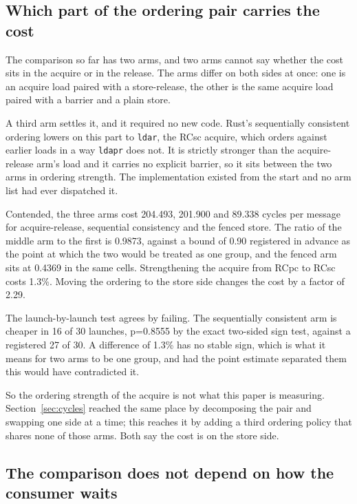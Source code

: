 \documentclass[conference]{IEEEtran}
\begin{document}
\subsection{Which part of the ordering pair carries the cost}

The comparison so far has two arms, and two arms cannot say whether the cost
sits in the acquire or in the release. The arms differ on both sides at once:
one is an acquire load paired with a store-release, the other is the same
acquire load paired with a barrier and a plain store.

A third arm settles it, and it required no new code. Rust's sequentially
consistent ordering lowers on this part to \texttt{ldar}, the RCsc acquire,
which orders against earlier loads in a way \texttt{ldapr} does not. It is
strictly stronger than the acquire-release arm's load and it carries no
explicit barrier, so it sits between the two arms in ordering strength. The
implementation existed from the start and no arm list had ever dispatched it.

Contended, the three arms cost 204.493, 201.900 and 89.338 cycles per message
for acquire-release, sequential consistency and the fenced store. The ratio of
the middle arm to the first is 0.9873, against a bound of 0.90 registered in
advance as the point at which the two would be treated as one group, and the
fenced arm sits at 0.4369 in the same cells. Strengthening the acquire from
RCpc to RCsc costs 1.3\%. Moving the ordering to the store side changes the
cost by a factor of 2.29.

The launch-by-launch test agrees by failing. The sequentially consistent arm
is cheaper in 16 of 30 launches, p=0.8555 by the exact two-sided sign test,
against a registered 27 of 30. A difference of 1.3\% has no stable sign, which
is what it means for two arms to be one group, and had the point estimate
separated them this would have contradicted it.

So the ordering strength of the acquire is not what this paper is measuring.
Section~\ref{sec:cycles} reached the same place by decomposing the pair and
swapping one side at a time; this reaches it by adding a third ordering policy
that shares none of those arms. Both say the cost is on the store side.

\subsection{The comparison does not depend on how the consumer waits}
\label{sec:wait}
\end{document}
